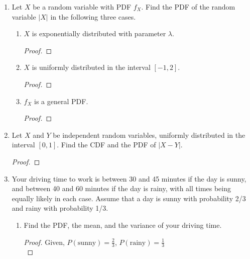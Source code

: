 \documentclass[paper=usletter, fontsize=12pt]{article}
\begin{document}

    \begin{enumerate}

        \item Let $X$ be a random variable with PDF $f_X$. Find the PDF of the
        random variable $|X|$ in the following three cases.
        \begin{enumerate}

            \item $X$ is exponentially distributed with parameter $\lambda$.
            \begin{proof}
            \end{proof}

            \item $X$ is uniformly distributed in the interval $[-1,2]$.
            \begin{proof}
            \end{proof}

            \item $f_X$ is a general PDF.
            \begin{proof}
            \end{proof}

        \end{enumerate}

        \item Let $X$ and $Y$ be independent random variables, uniformly
        distributed in the interval $[0,1]$. Find the CDF and the PDF of
        $|X-Y|$.
        \begin{proof}
        \end{proof}

        \item Your driving time to work is between 30 and 45 minutes if the day
        is sunny, and between 40 and 60 minutes if the day is rainy, with all
        times being equally likely in each case. Assume that a day is sunny
        with probability 2/3 and rainy with probability 1/3.
        \begin{enumerate}

            \item Find the PDF, the mean, and the variance of your driving
            time.
            \begin{proof}

                Given, $P(\text{sunny}) = \frac{2}{3}$, $P(\text{rainy}) =
                \frac{1}{3}$\\


\end{proof}
\end{enumerate}
\end{enumerate}
\end{document}
